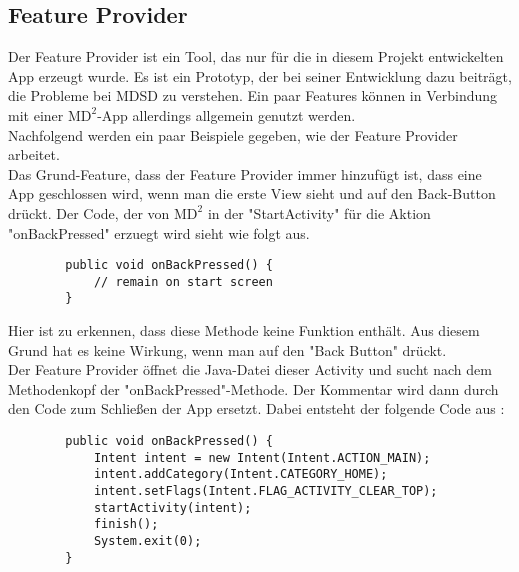 	\subsection{Feature Provider}
	Der Feature Provider ist ein Tool, das nur f\"ur die in diesem Projekt entwickelten App erzeugt wurde. Es ist ein Prototyp, der bei seiner Entwicklung dazu beitr\"agt, die Probleme bei MDSD zu verstehen. Ein paar Features k\"onnen in Verbindung mit einer $\text{MD}^2$-App allerdings allgemein genutzt werden.\\
	Nachfolgend werden ein paar Beispiele gegeben, wie der Feature Provider arbeitet.\\
	Das Grund-Feature, dass der Feature Provider immer hinzuf\"ugt ist, dass eine App geschlossen wird, wenn man die erste View sieht und auf den Back-Button dr\"uckt. Der Code, der von $\text{MD}^2$ in der "StartActivity" f\"ur die Aktion "onBackPressed" erzuegt wird sieht wie folgt aus.
	
	\begin{small}
		\begin{verbatim}
		public void onBackPressed() {
		    // remain on start screen
		}
		\end{verbatim}
	\end{small}

	\noindent Hier ist zu erkennen, dass diese Methode keine Funktion enth\"alt. Aus diesem Grund hat es keine Wirkung, wenn man auf den "Back Button" dr\"uckt.\\
	Der Feature Provider \"offnet die Java-Datei dieser Activity und sucht nach dem Methodenkopf der "onBackPressed"-Methode. Der Kommentar wird dann durch den Code zum Schlie\ss{}en der App ersetzt. Dabei entsteht der folgende Code aus \cite{backclose}:
	
	\begin{small}
		\begin{verbatim}
		public void onBackPressed() {
		    Intent intent = new Intent(Intent.ACTION_MAIN);
		    intent.addCategory(Intent.CATEGORY_HOME);
		    intent.setFlags(Intent.FLAG_ACTIVITY_CLEAR_TOP);
		    startActivity(intent);
		    finish();
		    System.exit(0);
		}
		\end{verbatim}
	\end{small}


